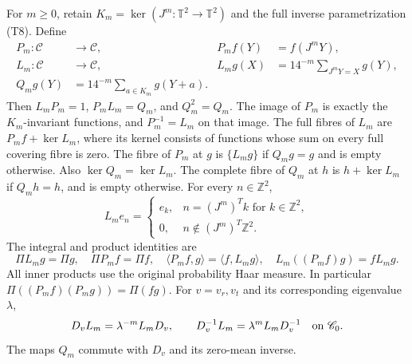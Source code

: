 \begin{theorem}
\label{thm:ns-continuous-transfer}
For $m\geq0$, retain $K_m=\ker(J^m:\mathbb T^2\to\mathbb T^2)$
and the full inverse parametrization (T8). Define
\[
\begin{aligned}
 P_m:\mathscr C&\longrightarrow\mathscr C,
 &P_mf(Y)&=f(J^mY),\\
 L_m:\mathscr C&\longrightarrow\mathscr C,
 &L_mg(X)&=14^{-m}\sum_{J^mY=X}g(Y),\\
 Q_mg(Y)&=14^{-m}\sum_{a\in K_m}g(Y+a).
\end{aligned}
\]
Then $L_mP_m=1$, $P_mL_m=Q_m$, and $Q_m^2=Q_m$.
The image of $P_m$ is exactly the $K_m$-invariant functions,
and $P_m^{-1}=L_m$ on that image. The full fibres of $L_m$ are
$P_mf+\ker L_m$, where its kernel consists of functions whose
sum on every full covering fibre is zero. The fibre of $P_m$ at
$g$ is $\{L_mg\}$ if $Q_mg=g$ and is empty otherwise.
Also $\ker Q_m=\ker L_m$. The complete fibre of $Q_m$ at
$h$ is $h+\ker L_m$ if $Q_mh=h$, and is empty otherwise.
For every $n\in\mathbb Z^2$,
\[
 L_me_n=
 \begin{cases}
 e_k,&n=(J^m)^Tk\text{ for }k\in\mathbb Z^2,\\
 0,&n\notin(J^m)^T\mathbb Z^2.
 \end{cases}
\]
The integral and product identities are
\[
 \Pi L_mg=\Pi g,\quad \Pi P_mf=\Pi f,\quad
 \langle P_mf,g\rangle=\langle f,L_mg\rangle,\quad
 L_m((P_mf)g)=fL_mg.
\]
All inner products use the original probability Haar measure.
In particular $\Pi((P_mf)(P_mg))=\Pi(fg)$.
For $v=v_r,v_t$ and its corresponding eigenvalue $\lambda$,
\[
 D_vL_m=\lambda^{-m}L_mD_v,
 \qquad D_v^{-1}L_m=\lambda^mL_mD_v^{-1}
 \quad\hbox{on }\mathscr C_0.
\]
The maps $Q_m$ commute with $D_v$ and its zero-mean inverse.
\end{theorem}
